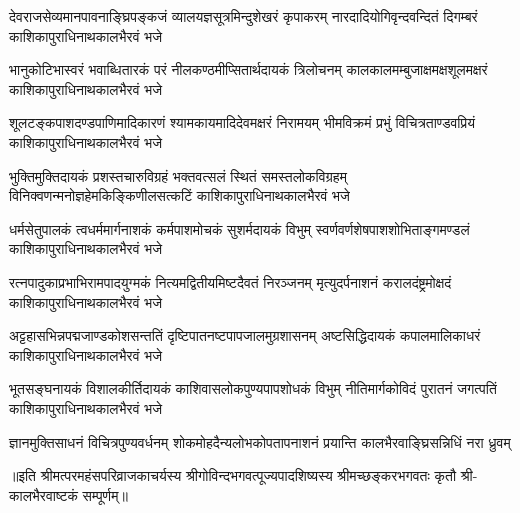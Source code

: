 
\fourlineindentedshloka
{देवराजसेव्यमानपावनाङ्घ्रिपङ्कजं}
{व्यालयज्ञसूत्रमिन्दुशेखरं कृपाकरम्}
{नारदादियोगिवृन्दवन्दितं दिगम्बरं}
{काशिकापुराधिनाथकालभैरवं भजे}%

\fourlineindentedshloka
{भानुकोटिभास्वरं भवाब्धितारकं परं}
{नीलकण्ठमीप्सितार्थदायकं त्रिलोचनम्}
{कालकालमम्बुजाक्षमक्षशूलमक्षरं}
{काशिकापुराधिनाथकालभैरवं भजे}%

\fourlineindentedshloka
{शूलटङ्कपाशदण्डपाणिमादिकारणं}
{श्यामकायमादिदेवमक्षरं निरामयम्}
{भीमविक्रमं प्रभुं विचित्रताण्डवप्रियं}
{काशिकापुराधिनाथकालभैरवं भजे}%

\fourlineindentedshloka
{भुक्तिमुक्तिदायकं प्रशस्तचारुविग्रहं}
{भक्तवत्सलं स्थितं समस्तलोकविग्रहम्}
{विनिक्वणन्मनोज्ञहेमकिङ्किणीलसत्कटिं}
{काशिकापुराधिनाथकालभैरवं भजे}%

\fourlineindentedshloka
{धर्मसेतुपालकं त्वधर्ममार्गनाशकं}
{कर्मपाशमोचकं सुशर्मदायकं विभुम्}
{स्वर्णवर्णशेषपाशशोभिताङ्गमण्डलं}
{काशिकापुराधिनाथकालभैरवं भजे}%

\fourlineindentedshloka
{रत्नपादुकाप्रभाभिरामपादयुग्मकं}
{नित्यमद्वितीयमिष्टदैवतं निरञ्जनम्}
{मृत्युदर्पनाशनं करालदंष्ट्रमोक्षदं}
{काशिकापुराधिनाथकालभैरवं भजे}%

\fourlineindentedshloka
{अट्टहासभिन्नपद्मजाण्डकोशसन्ततिं}
{दृष्टिपातनष्टपापजालमुग्रशासनम्}
{अष्टसिद्धिदायकं कपालमालिकाधरं}
{काशिकापुराधिनाथकालभैरवं भजे}%

\fourlineindentedshloka
{भूतसङ्घनायकं विशालकीर्तिदायकं}
{काशिवासलोकपुण्यपापशोधकं विभुम्}
{नीतिमार्गकोविदं पुरातनं जगत्पतिं}
{काशिकापुराधिनाथकालभैरवं भजे}%

{ज्ञानमुक्तिसाधनं विचित्रपुण्यवर्धनम्}
{शोकमोहदैन्यलोभकोपतापनाशनं}
{प्रयान्ति कालभैरवाङ्घ्रिसन्निधिं नरा ध्रुवम्}

॥इति श्रीमत्परमहंसपरिव्राजकाचर्यस्य श्रीगोविन्दभगवत्पूज्यपादशिष्यस्य श्रीमच्छङ्करभगवतः कृतौ श्री-कालभैरवाष्टकं सम्पूर्णम्॥
